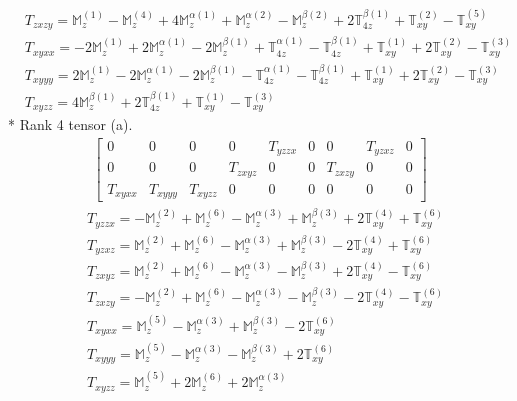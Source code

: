 \documentclass[fleqn,8pt,landscape]{jsarticle}
\begin{document}
\begin{align*}
& T_{zxzy} = \mathbb{M}_{z}^{(1)} - \mathbb{M}_{z}^{(4)} + 4 \mathbb{M}_{z}^{\alpha(1)} + \mathbb{M}_{z}^{\alpha(2)} - \mathbb{M}_{z}^{\beta(2)} + 2 \mathbb{T}_{4z}^{\beta(1)} + \mathbb{T}_{xy}^{(2)} - \mathbb{T}_{xy}^{(5)} \\
& T_{xyxx} = - 2 \mathbb{M}_{z}^{(1)} + 2 \mathbb{M}_{z}^{\alpha(1)} - 2 \mathbb{M}_{z}^{\beta(1)} + \mathbb{T}_{4z}^{\alpha(1)} - \mathbb{T}_{4z}^{\beta(1)} + \mathbb{T}_{xy}^{(1)} + 2 \mathbb{T}_{xy}^{(2)} - \mathbb{T}_{xy}^{(3)} \\
& T_{xyyy} = 2 \mathbb{M}_{z}^{(1)} - 2 \mathbb{M}_{z}^{\alpha(1)} - 2 \mathbb{M}_{z}^{\beta(1)} - \mathbb{T}_{4z}^{\alpha(1)} - \mathbb{T}_{4z}^{\beta(1)} + \mathbb{T}_{xy}^{(1)} + 2 \mathbb{T}_{xy}^{(2)} - \mathbb{T}_{xy}^{(3)} \\
& T_{xyzz} = 4 \mathbb{M}_{z}^{\beta(1)} + 2 \mathbb{T}_{4z}^{\beta(1)} + \mathbb{T}_{xy}^{(1)} - \mathbb{T}_{xy}^{(3)}
\end{align*}
* Rank 4 tensor (a).
\begin{align*}
\begin{bmatrix} 0 & 0 & 0 & 0 & T_{yzzx} & 0 & 0 & T_{yzxz} & 0 \\ 0 & 0 & 0 & T_{zxyz} & 0 & 0 & T_{zxzy} & 0 & 0 \\ T_{xyxx} & T_{xyyy} & T_{xyzz} & 0 & 0 & 0 & 0 & 0 & 0 \end{bmatrix}
\end{align*}
\begin{align*}
& T_{yzzx} = - \mathbb{M}_{z}^{(2)} + \mathbb{M}_{z}^{(6)} - \mathbb{M}_{z}^{\alpha(3)} + \mathbb{M}_{z}^{\beta(3)} + 2 \mathbb{T}_{xy}^{(4)} + \mathbb{T}_{xy}^{(6)} \\
& T_{yzxz} = \mathbb{M}_{z}^{(2)} + \mathbb{M}_{z}^{(6)} - \mathbb{M}_{z}^{\alpha(3)} + \mathbb{M}_{z}^{\beta(3)} - 2 \mathbb{T}_{xy}^{(4)} + \mathbb{T}_{xy}^{(6)} \\
& T_{zxyz} = \mathbb{M}_{z}^{(2)} + \mathbb{M}_{z}^{(6)} - \mathbb{M}_{z}^{\alpha(3)} - \mathbb{M}_{z}^{\beta(3)} + 2 \mathbb{T}_{xy}^{(4)} - \mathbb{T}_{xy}^{(6)} \\
& T_{zxzy} = - \mathbb{M}_{z}^{(2)} + \mathbb{M}_{z}^{(6)} - \mathbb{M}_{z}^{\alpha(3)} - \mathbb{M}_{z}^{\beta(3)} - 2 \mathbb{T}_{xy}^{(4)} - \mathbb{T}_{xy}^{(6)} \\
& T_{xyxx} = \mathbb{M}_{z}^{(5)} - \mathbb{M}_{z}^{\alpha(3)} + \mathbb{M}_{z}^{\beta(3)} - 2 \mathbb{T}_{xy}^{(6)} \\
& T_{xyyy} = \mathbb{M}_{z}^{(5)} - \mathbb{M}_{z}^{\alpha(3)} - \mathbb{M}_{z}^{\beta(3)} + 2 \mathbb{T}_{xy}^{(6)} \\
& T_{xyzz} = \mathbb{M}_{z}^{(5)} + 2 \mathbb{M}_{z}^{(6)} + 2 \mathbb{M}_{z}^{\alpha(3)}
\end{align*}
\end{document}
